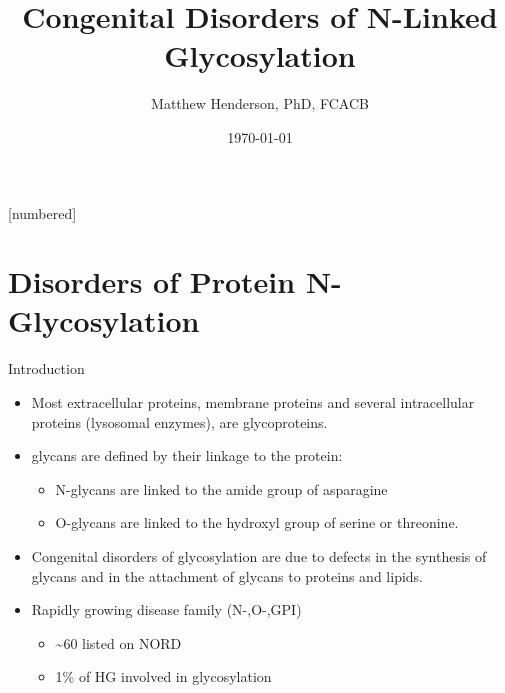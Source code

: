 \documentclass[presentation, smaller]{beamer}
\author{Matthew Henderson, PhD, FCACB}
\date{\today}
\title{Congenital Disorders of N-Linked Glycosylation}
\institute[NSO]{Newborn Screening Ontario | The University of Ottawa}
\begin{document}
\maketitle


\vspace{220pt}
\beamertemplatenavigationsymbolsempty
{}[numbered]

\section{Disorders of Protein N-Glycosylation}
\label{sec:org666aace}
\begin{frame}[label={sec:orgb3df3ea}]{Introduction}
\begin{itemize}
\item Most extracellular proteins, membrane proteins and several
intracellular proteins (lysosomal enzymes), are glycoproteins.

\item glycans are defined by their linkage to the protein:
\begin{itemize}
\item N-glycans are linked to the amide group of asparagine
\item O-glycans are linked to the hydroxyl group of serine or
threonine.
\end{itemize}

\item Congenital disorders of glycosylation are due to defects in the
synthesis of glycans and in the attachment of glycans to proteins
and lipids.
\item Rapidly growing disease family (N-,O-,GPI)
\begin{itemize}
\item \textasciitilde{}60 listed on NORD
\item 1\% of HG involved in glycosylation
\end{itemize}
\end{itemize}
\end{frame}
\end{document}
